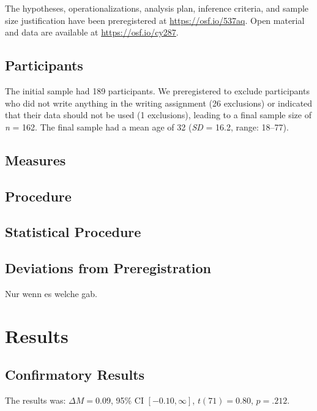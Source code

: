 \documentclass[
  stu,
  longtable,
  nolmodern,
  notxfonts,
  notimes,
  colorlinks=true,linkcolor=blue,citecolor=blue,urlcolor=blue]{apa7}
\begin{document}
The hypotheses, operationalizations, analysis plan, inference criteria,
and sample size justification have been preregistered at
\url{https://osf.io/537aq}. Open material and data are available at
\url{https://osf.io/cy287}.

\subsection{Participants}\label{participants}

The initial sample had 189 participants. We preregistered to exclude
participants who did not write anything in the writing assignment (26
exclusions) or indicated that their data should not be used (1
exclusions), leading to a final sample size of \emph{n} = 162. The final
sample had a mean age of 32 (\emph{SD} = 16.2, range: 18--77).

\subsection{Measures}\label{measures}

\subsection{Procedure}\label{procedure}

\subsection{Statistical Procedure}\label{statistical-procedure}

\subsection{Deviations from
Preregistration}\label{deviations-from-preregistration}

Nur wenn es welche gab.

\section{Results}\label{results}

\subsection{Confirmatory Results}\label{confirmatory-results}

The results was: \(\Delta M = 0.09\), 95\% CI \([-0.10, \infty]\),
\(t(71) = 0.80\), \(p = .212\).
\end{document}
